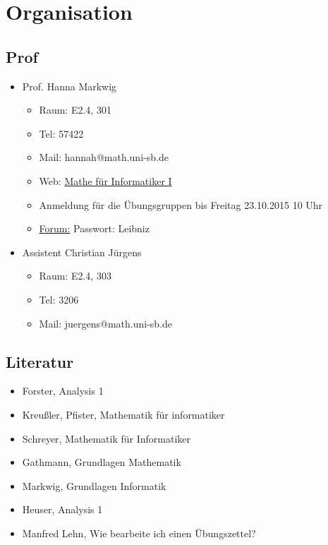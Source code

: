 \documentclass[pdftex,12pt,a4paper,fleqn]{scrartcl}
\title{\doctitle}
\subtitle{\docsubtitle}
\author{\docauthor}
\date{\docdate}
\begin{document}
 
\maketitle
\tableofcontents
\newpage

\section{Organisation} %
\label{sec:organisation}


\subsection{Prof} %
\label{sub:prof}
\begin{itemize}
	\item Prof. Hanna Markwig
	\begin{itemize}
	 	\item Raum: E2.4, 301
	 	\item Tel: 57422
	 	\item Mail: hannah@math.uni-sb.de
	 	\item Web: \href{https://www.math.uni-sb.de/wiki/doku.php?id=ag-seite:ag-markwig:teaching:eaz}{Mathe für Informatiker I}
	 	\item Anmeldung für die Übungsgruppen bis Freitag 23.10.2015 10 Uhr
	 	\item \href{https://forum.math.uni-sb.de/viewforum.php?f=53}{Forum:} Passwort: Leibniz
	 \end{itemize} 
	 \item Assistent Christian Jürgens
	 \begin{itemize}
	 	\item Raum: E2.4, 303
	 	\item Tel: 3206
	 	\item Mail: juergens@math.uni-sb.de
	 \end{itemize}
\end{itemize}

\subsection{Literatur} %
\label{sub:literatur}
\begin{itemize}
	\item Forster, Analysis 1
	\item Kreußler, Pfister, Mathematik für informatiker
	\item Schreyer, Mathematik für Informatiker
	\item Gathmann, Grundlagen Mathematik
	\item Markwig, Grundlagen Informatik
	\item Heuser, Analysis 1
	\item Manfred Lehn, Wie bearbeite ich einen Übungszettel?
\end{itemize}
\end{document}
